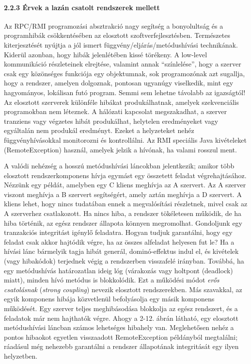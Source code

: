 \documentclass[
]{article}
\begin{document}
\hypertarget{uxe9rvek-a-lazuxe1n-csatolt-rendszerek-mellett}{%
\paragraph{2.2.3 Érvek a lazán csatolt rendszerek
mellett}\label{uxe9rvek-a-lazuxe1n-csatolt-rendszerek-mellett}}

Az RPC/RMI programozási absztrakció nagy segítség a bonyolultság és a
programhibák csökkentésében az elosztott szoftverfejlesztésben.
Természetes kiterjesztését nyújtja a jól ismert
függvény/eljárás/metódushívási technikának. Kiderül azonban, hogy hibák
jelenlétében kissé törékeny. A low-level kommunikáció részleteinek
elrejtése, valamint annak ``színlelése'', hogy a szerver csak egy
közönséges funkciója egy objektumnak, sok programozónak azt sugallja,
hogy a rendszer, amelyen dolgoznak, pontosan ugyanúgy viselkedik, mint
egy hagyományos, lokálisan futó program. Semmi sem lehetne távolabb az
igazságtól! Az elosztott szerverek különféle hibákat produkálhatnak,
amelyek szekvenciális programokban nem léteznek. A hálózati kapcsolat
megszakadhat, a szerver tranziens vagy végzetes hibát produkálhat,
helytelen eredményeket vagy egyáltalán nem produkál eredményt. Ezeket a
helyzeteket nehéz függvényhívásokkal monitorozni és kontrollálni. Az RMI
speciális Java kivételeket (RemoteException) használ, amelyek jelzik a
hívónak, ha valami rosszul ment.

A valódi nehézség a hosszú metódushívási láncokban jelentkezik; amikor
több elosztott rendszerkomponens hívja egymást egy összetett feladat
végrehajtásához. Nézzünk egy példát, amelyben egy C kliens meghívja az A
szervert. Az A szerver viszont meghívja a B szervert segítségért, amely
aztán meghívja a D szervert. A kliens lehet, hogy nincs tudatában ennek
a megvalósítási részletnek, mivel csak az A szerverhez csatlakozott. Ha
nincs hiba, a rendszer tökéletesen működik, de ha hiba történik, az
egész rendszer állapota könnyen megromolhat. Gondoljunk egy tranzakciós
integritást igénylő feladatra. Hogyan tudjuk garantálni, hogy egy
feladat csak akkor hajtódik végre, ha az összes alfeladat helyesen fut
le? Ha a hívási lánc bármelyik tagja hibát generál, dominó-effektus
indul el, és kivételek (vagy hibakódok) terjednek végig a rendszerben
visszafelé irányban. Továbbá, ha egy metódushívás határozatlan ideig lóg
(várakozás vagy holtpont (deadlock) miatt), minden hívó metódus is
blokkolódik. Ezt a működési módot \emph{erős csatolásnak} (\emph{strong
coupling}) nevezik elosztott rendszerekben. Más szavakkal, az egyik
komponens hibája közvetlenül befolyásolja egy másik komponens működését.
Egy szerver teljes meghibásodása blokkolja az egész rendszert, és a
feladatok már nem hajthatók végre. Ahogy a 2-12. ábrán látható, egy
elosztott metódushívási láncban számos lehetséges hibahely van.
Meglehetősen nehéz a pontos hibaokot egyetlen visszaadott
RemoteException példányból megtalálni; ráadásul még nehezebb garantálni
a rendszer állapotának integritását egy ilyen helyzetben.
\end{document}

